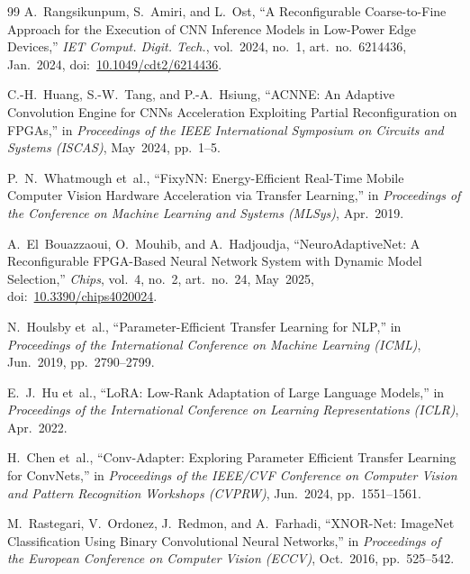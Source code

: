 \documentclass[conference]{IEEEtran}
\begin{document}
\begin{thebibliography}{99}
A.~Rangsikunpum, S.~Amiri, and L.~Ost,
``A Reconfigurable Coarse-to-Fine Approach for the Execution of CNN Inference Models in Low-Power Edge Devices,''
\emph{IET Comput. Digit. Tech.}, vol.~2024, no.~1, art.~no.~6214436, Jan.~2024,
doi:~\url{10.1049/cdt2/6214436}.

C.-H.~Huang, S.-W.~Tang, and P.-A.~Hsiung,
``ACNNE: An Adaptive Convolution Engine for CNNs Acceleration Exploiting Partial Reconfiguration on FPGAs,''
in \emph{Proceedings of the IEEE International Symposium on Circuits and Systems (ISCAS)}, May~2024, pp.~1--5.

P.~N.~Whatmough et~al.,
``FixyNN: Energy-Efficient Real-Time Mobile Computer Vision Hardware Acceleration via Transfer Learning,''
in \emph{Proceedings of the Conference on Machine Learning and Systems (MLSys)}, Apr.~2019.

A.~El~Bouazzaoui, O.~Mouhib, and A.~Hadjoudja,
``NeuroAdaptiveNet: A Reconfigurable FPGA-Based Neural Network System with Dynamic Model Selection,''
\emph{Chips}, vol.~4, no.~2, art.~no.~24, May~2025,
doi:~\url{10.3390/chips4020024}.

N.~Houlsby et~al.,
``Parameter-Efficient Transfer Learning for NLP,''
in \emph{Proceedings of the International Conference on Machine Learning (ICML)}, Jun.~2019, pp.~2790--2799.


E.~J.~Hu et~al.,
``LoRA: Low-Rank Adaptation of Large Language Models,''
in \emph{Proceedings of the International Conference on Learning Representations (ICLR)}, Apr.~2022.


H.~Chen et~al.,
``Conv-Adapter: Exploring Parameter Efficient Transfer Learning for ConvNets,''
in \emph{Proceedings of the IEEE/CVF Conference on Computer Vision and Pattern Recognition Workshops (CVPRW)}, Jun.~2024, pp.~1551--1561.

M.~Rastegari, V.~Ordonez, J.~Redmon, and A.~Farhadi,
``XNOR-Net: ImageNet Classification Using Binary Convolutional Neural Networks,''
in \emph{Proceedings of the European Conference on Computer Vision (ECCV)}, Oct.~2016, pp.~525--542.


\end{thebibliography}
\end{document}
